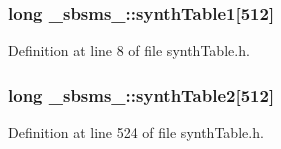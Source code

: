 \subsubsection[{\texorpdfstring{synth\+Table1}{synthTable1}}]{\setlength{\rightskip}{0pt plus 5cm}long \+\_\+sbsms\+\_\+\+::synth\+Table1\mbox{[}512\mbox{]}}\hypertarget{namespace__sbsms___a4fd8a5666954677b7bd6cabfd5905592}{}\label{namespace__sbsms___a4fd8a5666954677b7bd6cabfd5905592}


Definition at line 8 of file synth\+Table.\+h.

\subsubsection[{\texorpdfstring{synth\+Table2}{synthTable2}}]{\setlength{\rightskip}{0pt plus 5cm}long \+\_\+sbsms\+\_\+\+::synth\+Table2\mbox{[}512\mbox{]}}\hypertarget{namespace__sbsms___abeb508b163b33b08ec80ead37421be5a}{}\label{namespace__sbsms___abeb508b163b33b08ec80ead37421be5a}


Definition at line 524 of file synth\+Table.\+h.


